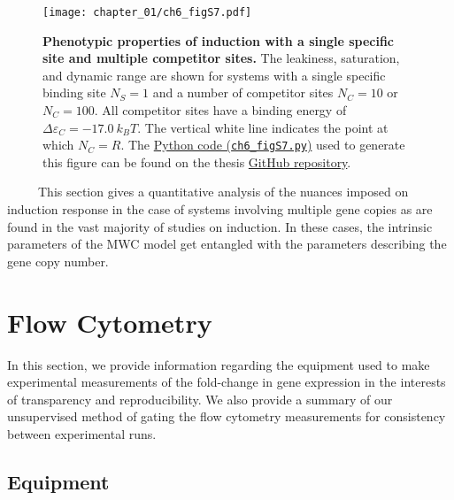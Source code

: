 \documentclass[12pt]{caltech_thesis}
\begin{document}
\hypertarget{fig:fugacity_properties_Nc}{%
\begin{figure}
\centering
\texttt{[image: chapter\_01/ch6\_figS7.pdf]}
\caption[{Phenotypic properties of induction with a single specific site
and multiple competitor sites.}]{\textbf{Phenotypic properties of
induction with a single specific site and multiple competitor sites.}
The leakiness, saturation, and dynamic range are shown for systems with
a single specific binding site \(N_S = 1\) and a number of competitor
sites \(N_C = 10\) or \(N_C = 100\). All competitor sites have a binding
energy of \(\Delta \varepsilon_C = -17.0~k_BT\). The vertical white line
indicates the point at which \(N_C = R\). The
\href{https://github.com/gchure/phd/blob/master/src/chapter_06/code/ch6_figS7.py}{Python
code (\texttt{ch6\_figS7.py})} used to generate this figure can be found
on the thesis \href{https://github.com/gchure/phd}{GitHub repository}.}
\label{fig:fugacity_properties_Nc}
\end{figure}
}

~~~~~This section gives a quantitative analysis of the nuances imposed
on induction response in the case of systems involving multiple gene
copies as are found in the vast majority of studies on induction. In
these cases, the intrinsic parameters of the MWC model get entangled
with the parameters describing the gene copy number.

\hypertarget{flow-cytometry-2}{%
\section{Flow Cytometry}\label{flow-cytometry-2}}

In this section, we provide information regarding the equipment used to
make experimental measurements of the fold-change in gene expression in
the interests of transparency and reproducibility. We also provide a
summary of our unsupervised method of gating the flow cytometry
measurements for consistency between experimental runs.

\hypertarget{equipment}{%
\subsection{Equipment}\label{equipment}}
\end{document}
